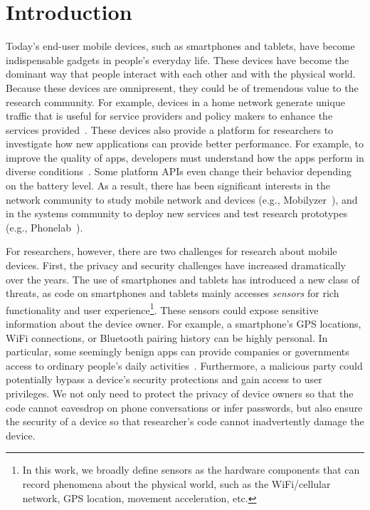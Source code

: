 \section{Introduction}

Today's end-user mobile devices, such as smartphones and
tablets, have become indispensable gadgets in people's everyday
life. These devices have become the dominant way that 
people interact with each other and with the physical world. Because 
these devices are omnipresent, they could be of tremendous value to 
the research community. For example, devices in a home network  
generate unique traffic that is useful for service providers and policy
makers to enhance the services provided~\cite{sundaresan2011broadband}.
These devices also provide a platform for researchers to
investigate how new applications can provide better performance.
For example, to improve the quality of apps, developers must 
understand how the apps perform in diverse 
conditions~\cite{ravindranath2012appinsight}. Some platform
APIs even change their behavior depending on the battery level.
As a result, there has been significant interests in the network
community to study mobile network and devices
(e.g., Mobilyzer~\cite{nikravesh2015mobilyzer}), and in the
systems community to deploy new services and test research
prototypes (e.g., Phonelab~\cite{phonelab, nandugudi2013phonelab}).  
					
For researchers, however, there are two challenges for research
about mobile devices. First, the privacy and security challenges
have increased dramatically over the years. The use of 
smartphones and tablets has introduced a new class of threats, 
as code on smartphones and tablets mainly accesses
\textit{sensors} for rich functionality and user experience\footnote{\scriptsize In 
this work, we broadly define sensors as the hardware components 
that can record phenomena about the physical world, such as the 
WiFi/cellular network, GPS location, movement acceleration, etc.}. 
These sensors could expose sensitive information about the device 
owner. For example, a smartphone's GPS locations,
WiFi connections, or Bluetooth pairing history can be highly
personal. In particular, some seemingly benign apps can provide 
companies or governments access to ordinary 
people's daily activities~\cite{AngryBirds}. Furthermore, 
a malicious party could potentially bypass a
device's security protections and gain access to user
privileges. We not only need to  protect the privacy
of device owners so that the code cannot eavesdrop on phone
conversations or infer passwords, but also ensure the security of a device
so that researcher's code cannot inadvertently damage 
the device.

